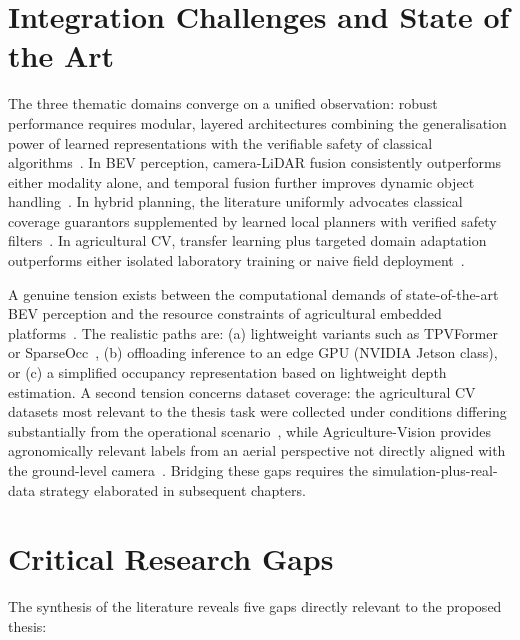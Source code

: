 \documentclass[12pt, a4paper]{article}
\begin{document}
\section{Integration Challenges and State of the Art}

The three thematic domains converge on a unified observation: robust performance requires
modular, layered architectures combining the generalisation power of learned representations
with the verifiable safety of classical algorithms~\cite{ref2, ref3, ref98, ref120}. In
BEV perception, camera-LiDAR fusion consistently outperforms either modality alone, and
temporal fusion further improves dynamic object handling~\cite{ref14, ref16}. In hybrid
planning, the literature uniformly advocates classical coverage guarantors supplemented by
learned local planners with verified safety filters~\cite{ref103, ref105, ref129}. In
agricultural CV, transfer learning plus targeted domain adaptation outperforms either
isolated laboratory training or naive field deployment~\cite{ref150, ref208}.

A genuine tension exists between the computational demands of state-of-the-art BEV
perception and the resource constraints of agricultural embedded
platforms~\cite{ref1, ref2}. The realistic paths are: (a) lightweight variants such as
TPVFormer~\cite{ref9, ref19} or SparseOcc~\cite{ref24}, (b) offloading inference to an
edge GPU (NVIDIA Jetson class), or (c) a simplified occupancy representation based on
lightweight depth estimation. A second tension concerns dataset coverage: the agricultural
CV datasets most relevant to the thesis task were collected under conditions differing
substantially from the operational scenario~\cite{ref154, ref167}, while Agriculture-Vision
provides agronomically relevant labels from an aerial perspective not directly aligned with
the ground-level camera~\cite{ref191, ref194}. Bridging these gaps requires the
simulation-plus-real-data strategy elaborated in subsequent chapters.

\section{Critical Research Gaps}

The synthesis of the literature reveals five gaps directly relevant to the proposed thesis:
\end{document}
